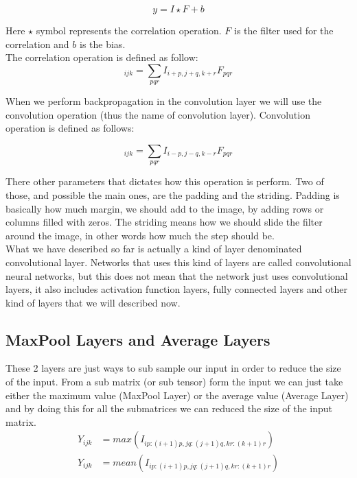 \documentclass[english,preprint,JIP]{ipsj}
\begin{document}
\begin{equation}
    y = I \star F + b
\end{equation}

Here $\star$ symbol represents the correlation operation. $F$ is the filter used
for the correlation and $b$ is the bias.\\

The correlation operation is defined as follow:\\
\begin{equation}
    [I \star F]_{ijk} = \sum_{pqr} I_{i+p,j+q,k+r}F_{pqr}
\end{equation}

When we perform backpropagation in the convolution layer we will use the
convolution operation (thus the name of convolution layer). Convolution
operation is defined as follows:

\begin{equation}
    [I * F]_{ijk} = \sum_{pqr} I_{i-p,j-q,k-r}F_{pqr}
\end{equation}

There other parameters that dictates how this operation is perform. Two of
those, and possible the main ones, are the padding and the striding. Padding is
basically how much margin, we should add to the image, by adding rows or columns
filled with zeros. The striding means how we should slide the filter around the
image, in other words how much the step should be.\\

What we have described so far is actually a kind of layer denominated
convolutional layer. Networks that uses this kind of layers are called
convolutional neural networks, but this does not mean that the network just uses
convolutional layers, it also includes activation function layers, fully
connected layers and other kind of layers that we will described now.

\subsection{MaxPool Layers and Average Layers}
These 2 layers are just ways to sub sample our input in order to reduce the size
of the input. From a sub matrix (or sub tensor) form the input we can just take
either the maximum value (MaxPool Layer) or the average value (Average Layer)
and by doing this for all the submatrices we can reduced the size of the input
matrix.\\

\begin{align}
    Y_{ijk} & = max(I_{ip:(i+1)p,jq:(j+1)q,kr:(k+1)r})  \\
    Y_{ijk} & = mean(I_{ip:(i+1)p,jq:(j+1)q,kr:(k+1)r})
\end{align}
\end{document}
